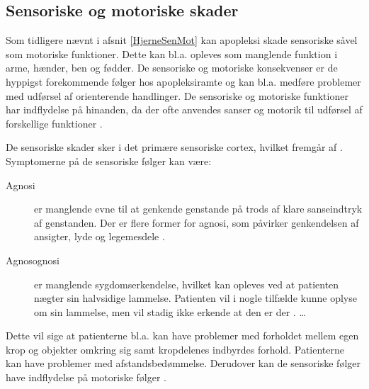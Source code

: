 \subsection{Sensoriske og motoriske skader} %
Som tidligere nævnt i afsnit \ref{HjerneSenMot} kan apopleksi skade sensoriske såvel som motoriske funktioner. Dette kan bl.a. opleves som manglende funktion i arme, hænder, ben og fødder. De sensoriske og motoriske konsekvenser er de hyppigst forekommende følger hos apopleksiramte og kan bl.a. medføre problemer med udførsel af orienterende handlinger. \cite{Sundhed.dk,DSfA2009}  De sensoriske og motoriske funktioner har indflydelse på hinanden, da der ofte anvendes sanser og motorik til udførsel af forskellige funktioner \cite{Nichols1997}. 


De sensoriske skader sker i det primære sensoriske cortex, hvilket fremgår af . Symptomerne på de sensoriske følger kan være:
\begin{description}
  \item[Agnosi] er manglende evne til at genkende genstande på trods af klare sanseindtryk af genstanden. Der er flere former for agnosi, som påvirker genkendelsen af ansigter, lyde og legemesdele . 
 \item[Agnosognosi] er manglende sygdomserkendelse, hvilket kan opleves ved at patienten nægter sin halvsidige lammelse. Patienten vil i nogle tilfælde kunne oplyse om sin lammelse, men vil stadig ikke erkende at den er der .
  \ldots
\end{description}
Dette vil sige at patienterne bl.a. kan have problemer med forholdet mellem egen krop og objekter omkring sig samt kropdelenes indbyrdes forhold. Patienterne kan have problemer med afstandsbedømmelse.\cite{Sundhed.dk,DSfA2009} Derudover kan de sensoriske følger have indflydelse på motoriske følger \cite{Nichols1997}. 

